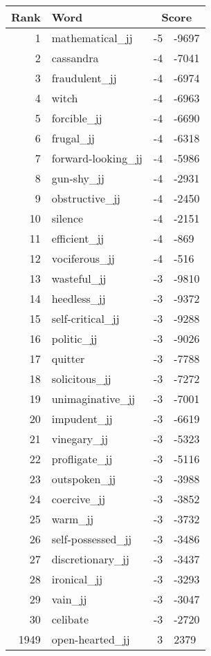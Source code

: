 \begin{longtable}[!htbp]{| rlr@{.}l |}
    \hline
    \textbf{Rank} & \textbf{Word} & \multicolumn{2}{c|}{\textbf{Score}} \\
    \hline
    \endhead
    1 & mathematical\_jj & -5 & -9697 \\
    2 & cassandra & -4 & -7041 \\
    3 & fraudulent\_jj & -4 & -6974 \\
    4 & witch & -4 & -6963 \\
    5 & forcible\_jj & -4 & -6690 \\
    6 & frugal\_jj & -4 & -6318 \\
    7 & forward-looking\_jj & -4 & -5986 \\
    8 & gun-shy\_jj & -4 & -2931 \\
    9 & obstructive\_jj & -4 & -2450 \\
    10 & silence & -4 & -2151 \\
    11 & efficient\_jj & -4 & -869 \\
    12 & vociferous\_jj & -4 & -516 \\
    13 & wasteful\_jj & -3 & -9810 \\
    14 & heedless\_jj & -3 & -9372 \\
    15 & self-critical\_jj & -3 & -9288 \\
    16 & politic\_jj & -3 & -9026 \\
    17 & quitter & -3 & -7788 \\
    18 & solicitous\_jj & -3 & -7272 \\
    19 & unimaginative\_jj & -3 & -7001 \\
    20 & impudent\_jj & -3 & -6619 \\
    21 & vinegary\_jj & -3 & -5323 \\
    22 & profligate\_jj & -3 & -5116 \\
    23 & outspoken\_jj & -3 & -3988 \\
    24 & coercive\_jj & -3 & -3852 \\
    25 & warm\_jj & -3 & -3732 \\
    26 & self-possessed\_jj & -3 & -3486 \\
    27 & discretionary\_jj & -3 & -3437 \\
    28 & ironical\_jj & -3 & -3293 \\
    29 & vain\_jj & -3 & -3047 \\
    30 & celibate & -3 & -2720 \\
    1949 & open-hearted\_jj & 3 & 2379 \\

\end{longtable}

